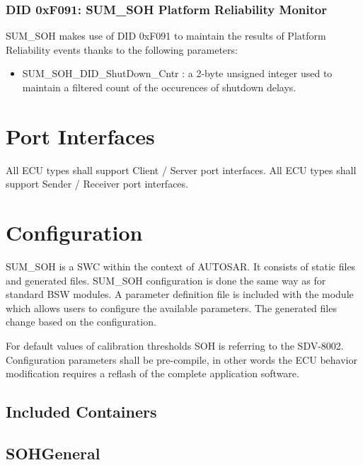 \subsubsection{DID 0xF091: SUM_SOH Platform Reliability Monitor}

{
	SUM_SOH makes use of DID 0xF091 to maintain the results of Platform Reliability events thanks to the following parameters:
	\begin{itemize}
		\item SUM_SOH_DID_ShutDown_Cntr : a 2-byte unsigned integer used to maintain a filtered count of the occurences of shutdown delays.
	\end{itemize}
}
{		}




\section{Port Interfaces}
\label{subsection:interfaces}

All ECU types shall support Client / Server port interfaces.
All ECU types shall support Sender / Receiver port interfaces.






\section{Configuration}
\label{subsection:configuration}

SUM\_SOH is a SWC within the context of AUTOSAR.
It consists of static files and generated files.
SUM\_SOH configuration is done the same way as for standard BSW modules.
A parameter definition file is included with the module which allows users to configure the available parameters.
The generated files change based on the configuration.

For default values of calibration thresholds SOH is referring to the SDV-8002.
Configuration parameters shall be pre-compile, in other words the ECU behavior modification requires
a reflash of the complete application software.


\subsection{Included Containers}


\subsection{SOHGeneral}
\label{subsection:SOHGen}

